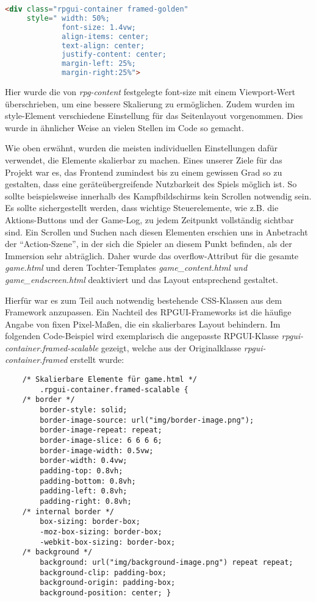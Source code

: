 \begin{lstlisting}[language=html]
<div class="rpgui-container framed-golden" 
     style=" width: 50%;
             font-size: 1.4vw; 
             align-items: center;
             text-align: center;
             justify-content: center;
             margin-left: 25%; 
             margin-right:25%">
\end{lstlisting}

Hier wurde die von \textit{rpg-content} festgelegte font-size mit einem Viewport-Wert überschrieben, um eine bessere Skalierung zu ermöglichen. Zudem wurden im style-Element verschiedene Einstellung für das Seitenlayout vorgenommen. Dies wurde in ähnlicher Weise an vielen Stellen im Code so gemacht.

Wie oben erwähnt, wurden die meisten individuellen Einstellungen dafür verwendet, die Elemente skalierbar zu machen. Eines unserer Ziele für das Projekt war es, das Frontend zumindest bis zu einem gewissen Grad so zu gestalten, dass eine geräteübergreifende Nutzbarkeit des Spiels möglich ist. So sollte beispielsweise innerhalb des Kampfbildschirms kein Scrollen notwendig sein. Es sollte sichergestellt werden, dass wichtige Steuerelemente, wie z.B. die Aktions-Buttons und der Game-Log, zu jedem Zeitpunkt vollständig sichtbar sind. Ein Scrollen und Suchen nach diesen Elementen erschien uns in Anbetracht der \enquote{Action-Szene}, in der sich die Spieler an diesem Punkt befinden, als der Immersion sehr abträglich. Daher wurde das overflow-Attribut für die gesamte \textit{game.html} und deren Tochter-Templates \textit{game\_content.html und game\_endscreen.html} deaktiviert und das Layout entsprechend gestaltet. 

Hierfür war es zum Teil auch notwendig bestehende CSS-Klassen aus dem Framework anzupassen. Ein Nachteil des RPGUI-Frameworks ist die häufige Angabe von fixen Pixel-Maßen, die ein skalierbares Layout behindern. Im folgenden Code-Beispiel wird exemplarisch die angepasste RPGUI-Klasse \textit{rpgui-container.framed-scalable} gezeigt, welche aus der Originalklasse \textit{rpgui-container.framed} erstellt wurde:

\pagebreak
\begin{lstlisting}
    /* Skalierbare Elemente für game.html */
        .rpgui-container.framed-scalable {
    /* border */
        border-style: solid;
        border-image-source: url("img/border-image.png");
        border-image-repeat: repeat;
        border-image-slice: 6 6 6 6;
        border-image-width: 0.5vw;
        border-width: 0.4vw;
        padding-top: 0.8vh;
        padding-bottom: 0.8vh;
        padding-left: 0.8vh;
        padding-right: 0.8vh;
    /* internal border */
        box-sizing: border-box;
        -moz-box-sizing: border-box;
        -webkit-box-sizing: border-box;
    /* background */
        background: url("img/background-image.png") repeat repeat;
        background-clip: padding-box;
        background-origin: padding-box;
        background-position: center; }
\end{lstlisting}

